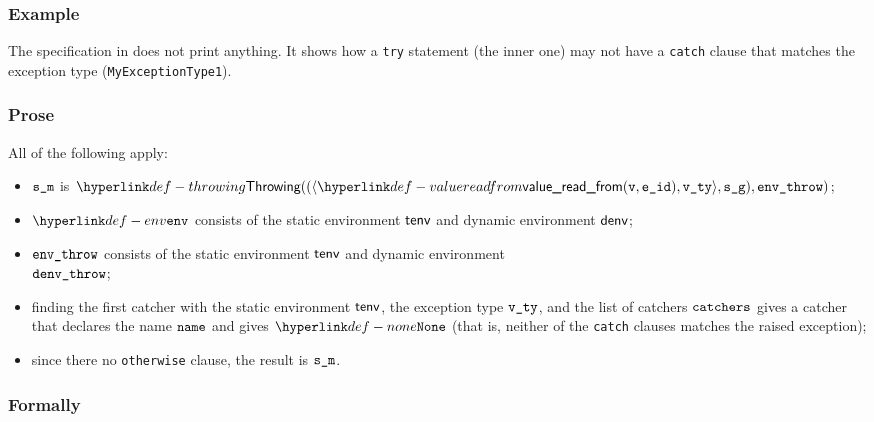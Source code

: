 \subsubsection{Example}
The specification in  does not print anything.
It shows how a \texttt{try} statement (the inner one) may not have a \texttt{catch} clause
that matches the exception type (\texttt{MyExceptionType1}).

\subsubsection{Prose}
All of the following apply:
\begin{itemize}
  \item $\sm$ is $\Throwing((\langle \valuereadfrom(\vv, \eid), \vvty \rangle, \sg), \envthrow)$;
  \item $\env$ consists of the static environment $\tenv$ and dynamic environment $\denv$;
  \item $\envthrow$ consists of the static environment $\tenv$ and dynamic environment \\ $\denvthrow$;
  \item finding the first catcher with the static environment $\tenv$, the exception type $\vvty$,
  and the list of catchers $\catchers$ gives a catcher that declares the name $\name$ and gives $\None$
  (that is, neither of the \texttt{catch} clauses matches the raised exception);
  \item since there no \texttt{otherwise} clause, the result is $\sm$.
\end{itemize}
\subsubsection{Formally}
\begin{mathpar}
\end{mathpar}


